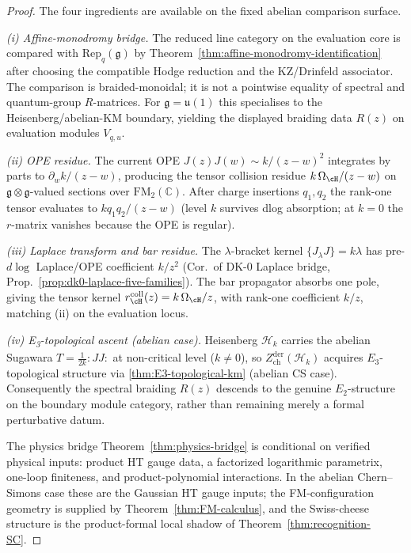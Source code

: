 \begin{proof}
The four ingredients are available on the fixed abelian comparison
surface.

\emph{(i) Affine-monodromy bridge.} The reduced line category on the
evaluation core is compared with $\mathrm{Rep}_q(\mathfrak{g})$ by
Theorem~\ref{thm:affine-monodromy-identification} after choosing the
compatible Hodge reduction and the KZ/Drinfeld associator. The
comparison is braided-monoidal; it is not a pointwise equality of
spectral and quantum-group $R$-matrices. For
$\mathfrak{g}=\mathfrak{u}(1)$ this specialises to the
Heisenberg/abelian-KM boundary, yielding the displayed braiding data
$R(z)$ on evaluation modules $V_{q,u}$.

\emph{(ii) OPE residue.} The current OPE $J(z)J(w)\sim k/(z-w)^2$ integrates by parts to $\partial_w k/(z-w)$, producing the tensor collision residue $k\,\Omega_{\cH}/(z-w)$ on $\mathfrak{g}\otimes\mathfrak{g}$-valued sections over $\mathrm{FM}_2(\mathbb{C})$. After charge insertions $q_1,q_2$ the rank-one tensor evaluates to \(kq_1q_2/(z-w)\) (level $k$ survives dlog absorption; at $k=0$ the $r$-matrix vanishes because the OPE is regular).

\emph{(iii) Laplace transform and bar residue.} The $\lambda$-bracket kernel $\{J_\lambda J\}=k\lambda$ has pre-\textup{\(d\log\)} Laplace/OPE coefficient $k/z^2$ (Cor.\ of DK-$0$ Laplace bridge, Prop.~\ref{prop:dk0-laplace-five-families}). The bar propagator absorbs one pole, giving the tensor kernel $r^{\mathrm{coll}}_{\cH}(z)=k\,\Omega_{\cH}/z$, with rank-one coefficient $k/z$, matching (ii) on the evaluation locus.

\emph{(iv) E\textsubscript{3}-topological ascent (abelian case).} Heisenberg $\mathcal{H}_k$ carries the abelian Sugawara $T=\tfrac{1}{2k}{:}JJ{:}$ at non-critical level ($k\neq 0$), so $Z^{\mathrm{der}}_{\mathrm{ch}}(\mathcal{H}_k)$ acquires $E_3$-topological structure via \ref{thm:E3-topological-km} (abelian CS case). Consequently the spectral braiding $R(z)$ descends to the genuine $E_2$-structure on the boundary module category, rather than remaining merely a formal perturbative datum.

The physics bridge Theorem~\ref{thm:physics-bridge} is conditional
on verified physical inputs: product HT gauge data, a factorized
logarithmic parametrix, one-loop finiteness, and product-polynomial
interactions. In the abelian Chern--Simons case these are the
Gaussian HT gauge inputs; the FM-configuration geometry is supplied
by Theorem~\ref{thm:FM-calculus}, and the Swiss-cheese structure is
the product-formal local shadow of Theorem~\ref{thm:recognition-SC}.
\end{proof}

